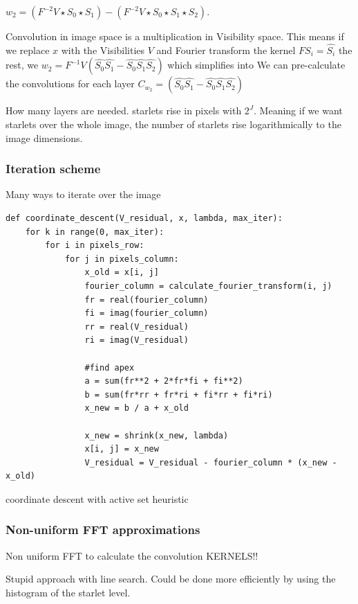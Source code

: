 $w_2 = (F^{-2}V \star S_0 \star S_1) - (F^{-2}V \star S_0 \star S_1 \star S_2)$.

Convolution in image space is a multiplication in Visibility space. This means if we replace $x$ with the Visibilities $V$ and Fourier transform the kernel $FS_i = \hat{S_i}$ the rest, we $w_2 = F^{-1}V(\hat{S_0}\hat{S_1} - \hat{S_0}\hat{S_1}\hat{S_2}) $ which simplifies into 
We can pre-calculate the convolutions for each layer $C_{w_2} = (\hat{S_0}\hat{S_1} - \hat{S_0}\hat{S_1}\hat{S_2})$

How many layers are needed. starlets rise in pixels with $2^J$. Meaning if we want starlets over the whole image, the number of starlets rise logarithmically to the image dimensions.

\subsubsection{Iteration scheme}
Many ways to iterate over the image

\begin{lstlisting} 
def coordinate_descent(V_residual, x, lambda, max_iter):
	for k in range(0, max_iter):
		for i in pixels_row:
			for j in pixels_column:
				x_old = x[i, j]
				fourier_column = calculate_fourier_transform(i, j)
				fr = real(fourier_column)
				fi = imag(fourier_column)
				rr = real(V_residual)
				ri = imag(V_residual)
				
				#find apex
				a = sum(fr**2 + 2*fr*fi + fi**2)
				b = sum(fr*rr + fr*ri + fi*rr + fi*ri)
				x_new = b / a + x_old
				
				x_new = shrink(x_new, lambda)
				x[i, j] = x_new
				V_residual = V_residual - fourier_column * (x_new - x_old)
\end{lstlisting}\label{cd:implementation}

coordinate descent with active set heuristic

\subsubsection{Non-uniform FFT approximations}
Non uniform FFT to calculate the convolution KERNELS!!


Stupid approach with line search. Could be done more efficiently by using the histogram of the starlet level.

